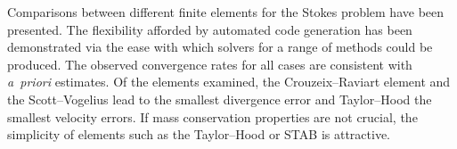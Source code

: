 Comparisons between different finite elements for the Stokes problem
have been presented. The flexibility afforded by automated code
generation has been demonstrated via the ease with which solvers for a
range of methods could be produced. The observed convergence rates for
all cases are consistent with \emph{a~priori} estimates. Of the
elements examined, the Crouzeix--Raviart element and the
Scott--Vogelius lead to the smallest divergence error and Taylor--Hood
the smallest velocity errors. If mass conservation properties are not
crucial, the simplicity of elements such as the Taylor--Hood or STAB
is attractive.
